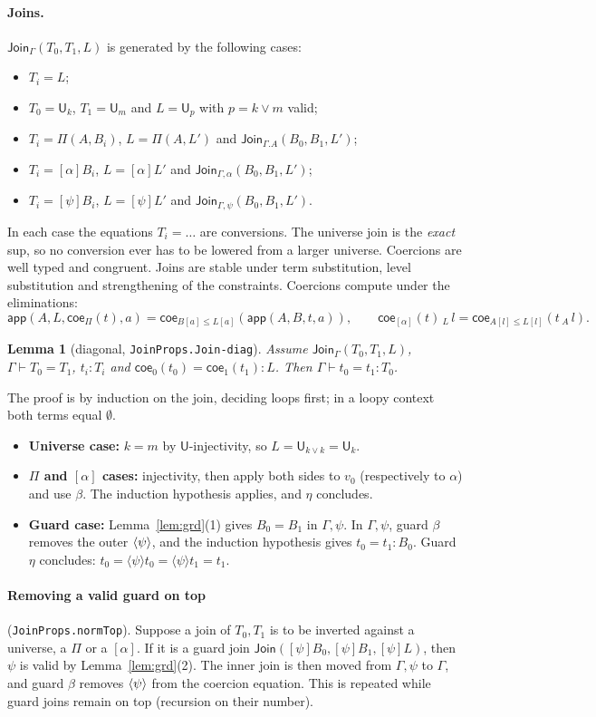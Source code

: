 \documentclass[10pt]{article}
\newcommand{\U}{\mathsf{U}}
\newcommand{\app}{\mathsf{app}}
\newcommand{\coe}{\mathsf{coe}}
\newcommand{\Jn}{\mathsf{Join}}
\newcommand{\Emp}{\emptyset}
\newcommand{\grd}[2]{[#1]#2}
\newcommand{\glam}[2]{\langle #1\rangle #2}
\newcommand{\lpi}[1]{[\alpha]#1}
\newcommand{\agda}[1]{\texttt{#1}}
\newtheorem{lemma}[theorem]{Lemma}
\theoremstyle{remark}
\begin{document}
\paragraph{Joins.}  $\Jn_\Gamma(T_0,T_1,L)$ is generated by the following
cases:
\begin{itemize}
\item $T_i=L$;
\item $T_0=\U_k$, $T_1=\U_m$ and $L=\U_p$ with $p=k\vee m$ valid;
\item $T_i=\Pi(A,B_i)$, $L=\Pi(A,L')$ and $\Jn_{\Gamma.A}(B_0,B_1,L')$;
\item $T_i=\lpi{B_i}$, $L=\lpi{L'}$ and $\Jn_{\Gamma,\alpha}(B_0,B_1,L')$;
\item $T_i=\grd\psi B_i$, $L=\grd\psi L'$ and $\Jn_{\Gamma,\psi}(B_0,B_1,L')$.
\end{itemize}
In each case the equations $T_i=\ldots$ are conversions.  The universe join
is the \emph{exact} sup, so no conversion ever has to be lowered from a
larger universe.  Coercions are well typed and congruent.  Joins are stable
under term substitution, level substitution and strengthening of the
constraints.  Coercions compute under the eliminations:
\[
\app(A,L,\coe_{\Pi}(t),a)=\coe_{B[a]\le L[a]}(\app(A,B,t,a)),\qquad
\coe_{[\alpha]}(t)\,{}_L\,l=\coe_{A[l]\le L[l]}(t\,{}_A\,l).
\]

\begin{lemma}[diagonal, \agda{JoinProps.Join-diag}]
Assume $\Jn_\Gamma(T_0,T_1,L)$, $\Gamma\vdash T_0=T_1$, $t_i:T_i$ and
$\coe_0(t_0)=\coe_1(t_1):L$.  Then $\Gamma\vdash t_0=t_1:T_0$.
\end{lemma}
\noindent
The proof is by induction on the join, deciding loops first; in a loopy
context both terms equal $\Emp$.
\begin{itemize}
\item \textbf{Universe case:} $k=m$ by $\U$-injectivity, so $L=\U_{k\vee k}=\U_k$.
\item \textbf{$\Pi$ and $[\alpha]$ cases:} injectivity, then apply both sides
  to $v_0$ (respectively to $\alpha$) and use $\beta$.  The induction
  hypothesis applies, and $\eta$ concludes.
\item \textbf{Guard case:} Lemma~\ref{lem:grd}(1) gives $B_0=B_1$ in
  $\Gamma,\psi$.  In $\Gamma,\psi$, guard $\beta$ removes the outer
  $\glam\psi$, and the induction hypothesis gives $t_0=t_1:B_0$.  Guard
  $\eta$ concludes: $t_0=\glam\psi t_0=\glam\psi t_1=t_1$.
\end{itemize}

\paragraph{Removing a valid guard on top} (\agda{JoinProps.normTop}).
Suppose a join of $T_0,T_1$ is to be inverted against a universe, a $\Pi$
or a $[\alpha]$.  If it is a guard join $\Jn(\grd\psi B_0,\grd\psi B_1,\grd\psi L)$,
then $\psi$ is valid by Lemma~\ref{lem:grd}(2).  The inner join is then moved
from $\Gamma,\psi$ to $\Gamma$, and guard $\beta$ removes $\glam\psi$ from the
coercion equation.  This is repeated while guard joins remain on top
(recursion on their number).
\end{document}
